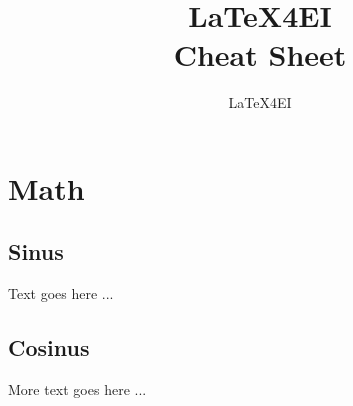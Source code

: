 \documentclass[english]{latex4ei/latex4ei_sheet}
\title{LaTeX4EI \\ Cheat Sheet}
\author{LaTeX4EI}                    %
\begin{document}
\maketitle   %


\section{Math}

\begin{sectionbox}
	\subsection{Sinus}

	Text goes here ...


\end{sectionbox}


\begin{sectionbox}
	\subsection{Cosinus}

	More text goes here ...

\end{sectionbox}


\end{document}
